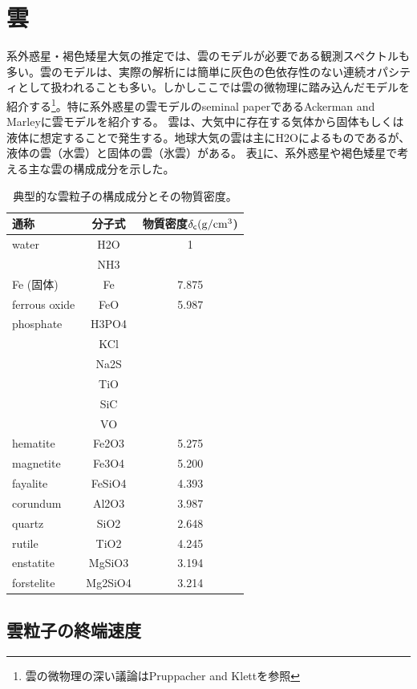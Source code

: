 \section{雲}

系外惑星・褐色矮星大気の推定では、雲のモデルが必要である観測スペクトルも多い。雲のモデルは、実際の解析には簡単に灰色の色依存性のない連続オパシティとして扱われることも多い。しかしここでは雲の微物理に踏み込んだモデルを紹介する\footnote{雲の微物理の深い議論はPruppacher and Klett\cite{pruppacher2010microstructure}を参照}。特に系外惑星の雲モデルのseminal paperであるAckerman and Marley\cite{ackerman2001precipitating}に雲モデルを紹介する。 雲は、大気中に存在する気体から固体もしくは液体に想定することで発生する。地球大気の雲は主にH2Oによるものであるが、液体の雲（水雲）と固体の雲（氷雲）がある。 表\ref{tab:input2}に、系外惑星や褐色矮星で考える主な雲の構成成分を示した。

\begin{table}[!tbh]
\begin{center}
\caption{典型的な雲粒子の構成成分とその物質密度。\label{tab:input2}}
\begin{tabular}{lcc}
  \hline\hline
  通称&分子式&物質密度$\delta_{\mathsf{c}} (\mathrm{g/cm^{3}}$) \\
  \hline
water&H2O& 1 \\
&NH3& \\
Fe (固体) &Fe&7.875\\
ferrous oxide&FeO&5.987\\
phosphate &H3PO4& \\
&KCl&\\
&Na2S&\\
&TiO&\\
&SiC&\\
&VO&\\
hematite     &Fe2O3&5.275\\
magnetite    &Fe3O4&5.200\\
fayalite     &FeSiO4&4.393\\
corundum     &Al2O3&3.987\\
quartz       &SiO2&2.648\\
rutile       &TiO2&4.245\\
enstatite    &MgSiO3&3.194\\
forstelite   &Mg2SiO4&3.214\\
\end{tabular}
\end{center}
\end{table}

\subsection*{雲粒子の終端速度}\label{ss:termv}

